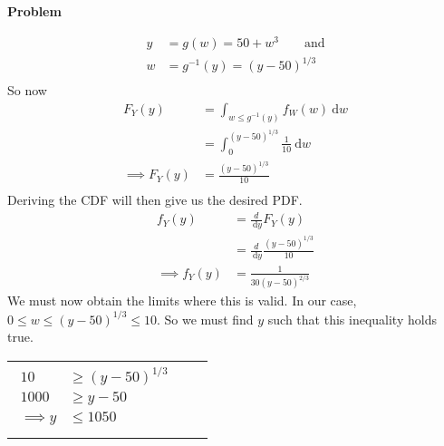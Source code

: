 \documentclass[12pt]{article}
\newenvironment{Ex}{\textbf{Problem}\vspace{.75em}\\}{}
\newcommand{\dd}[1]{\:\mathrm{d}{#1}}
\begin{document}
\begin{enumerate}
\begin{Ex}
\begin{solution}
\begin{enumerate}
\begin{equation}
          \label{eq:4b-setup}
          \begin{aligned}
            y &= g(w) = 50 + w^3  \quad\quad\text{and} \\
            w &= g^{-1}(y) = (y-50)^{1/3} \\
          \end{aligned}
        \end{equation}
        So now
        \begin{equation}
          \label{eq:4b-cdf}
          \begin{aligned}
            F_Y(y) &= \int_{w\le g^{-1}(y)} f_W(w) \dd{w} \\
            &= \int_{0}^{(y-50)^{1/3}} \frac{1}{10} \dd{w} \\
            \implies F_Y(y) &= \frac{(y-50)^{1/3}}{10} \\
          \end{aligned}
        \end{equation}
        Deriving the CDF will then give us the desired PDF.
        \begin{equation}
          \label{eq:4b-pdf}
          \begin{aligned}
            f_Y(y) &= \frac{d}{\dd{y}} F_Y(y) \\
            &= \frac{d}{\dd{y}} \frac{(y-50)^{1/3}}{10} \\
            \implies f_Y(y) &= \frac{1}{30 (y-50)^{2/3}}
          \end{aligned}
        \end{equation}
        We must now obtain the limits where this is valid. In our
        case, $0\le w \le (y-50)^{1/3} \le 10$. So we must find $y$
        such that this inequality holds true.
        \begin{table}[H]
          \centering
          \label{eq:4b-limits}
          \begin{tabularx}{\linewidth}{XX}
            \begin{equation}
              \begin{aligned}
                10 &\ge(y-50)^{1/3} \\
                1000 &\ge y-50 \\
                \implies y &\le 1050 \\
              \end{aligned}
            \end{equation}
            &
            \begin{equation}
              \begin{aligned}

\end{aligned}
\end{equation}
\end{tabularx}
\end{table}
\end{enumerate}
\end{solution}
\end{Ex}
\end{enumerate}
\end{document}
